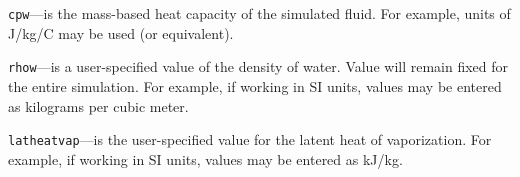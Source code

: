 \begin{description}
\item \texttt{cpw}---is the mass-based heat capacity of the simulated fluid. For example, units of J/kg/C may be used (or equivalent).

\item \texttt{rhow}---is a user-specified value of the density of water. Value will remain fixed for the entire simulation.  For example, if working in SI units, values may be entered as kilograms per cubic meter.

\item \texttt{latheatvap}---is the user-specified value for the latent heat of vaporization. For example, if working in SI units, values may be entered as kJ/kg.

\end{description}

